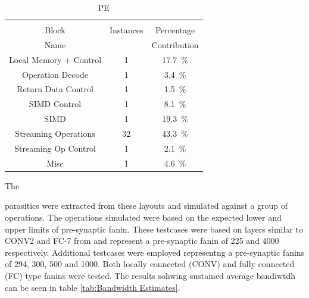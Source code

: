 \documentclass[journal]{IEEEtran}
\begin{document}
\begin{table}[h]
  \bigskip
  \begin{subtable}{0.5\textwidth}
    \centering
    \begin{adjustbox}{width=0.85\textwidth}
      \begin{tabular}{ccc}
        \toprule
                         &          &                                          \\  %
            Block        &Instances & Percentage                               \\  %
            Name         &          & Contribution                             \\  %
        \hline  %
 Local Memory + Control  & 1&\SI[per-mode=symbol]{17.7}{\percent}  \\ 
     Operation Decode    & 1&\SI[per-mode=symbol]{ 3.4}{\percent}  \\
   Return Data Control   & 1&\SI[per-mode=symbol]{ 1.5}{\percent}  \\
    SIMD Control         & 1&\SI[per-mode=symbol]{ 8.1}{\percent}  \\
        SIMD             & 1&\SI[per-mode=symbol]{19.3}{\percent}  \\
  Streaming Operations   &32&\SI[per-mode=symbol]{43.3}{\percent}  \\
  Streaming Op Control   & 1&\SI[per-mode=symbol]{ 2.1}{\percent}  \\
        Misc             & 1&\SI[per-mode=symbol]{ 4.6}{\percent}  \\
        \bottomrule
      \end{tabular}
    \end{adjustbox}
    \vspace{3pt}
    \captionsetup{justification=centering, skip=10pt}
    \caption{PE}
    \label{tab:PE Area Contribution}
  \end{subtable}
  \end{table}


\iffalse
Although the design is yet to close timing, the 
\else
The
\fi
parasitics were extracted from these layouts and simulated against a group of operations. 
The operations simulated were based on the expected lower and upper limits of pre-synaptic fanin. 
These testcases were based on layers similar to CONV2 and FC-7 from \cite{krizhevsky2012imagenet} and represent a pre-synaptic fanin of 225 and 4000 respectively.
Additional testcases were employed representng a pre-synaptic fanins of 294, 300, 500 and 1000. Both locally connected (CONV) and fully connected (FC) type fanins were tested.
The results sohwing sustained average bandiwtdh can be seen in table \ref{tab:Bandwidth Estimates}.
\end{document}
